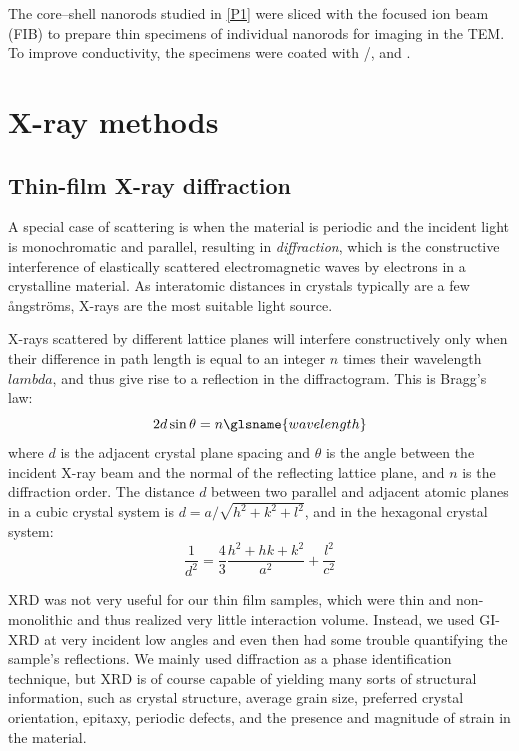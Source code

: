 \documentclass[draft,webedition,openright,titles,swedish,english]{LuaUUThesis}\usepackage[]{graphicx}\usepackage[]{xcolor}
\begin{document}
The core--shell nanorods studied in \cref{P1} were sliced with the
focused ion beam (FIB) to prepare thin specimens of individual nanorods for imaging in the \gls{TEM}.
To improve conductivity, the specimens were coated with /, and .




\section{X-ray methods}%
\label{methods:xray}

\subsection{Thin-film X-ray diffraction}%
\label{methods:XRD}

A special case of scattering is when the material is periodic and the
incident light is monochromatic and parallel, resulting in \emph{diffraction},
which is
the constructive interference of elastically scattered electromagnetic waves
by electrons in a crystalline material.
As interatomic distances in crystals typically are a few ångströms,
X-rays are the most suitable light source.

X-rays scattered by different lattice planes will interfere constructively only
when their difference in path length is equal to an integer $n$ times their
wavelength $lambda$, and thus give rise to a reflection in the diffractogram.
This is Bragg's law:
\begin{equation}\label{eq:xrd-bragg}
2d\sin\theta = n\glsname{wavelength}
\end{equation}
where $d$ is the adjacent crystal plane spacing and $\theta$ is the angle
between the incident X-ray beam and the normal of the reflecting lattice plane,
and $n$ is the diffraction order.
The distance $d$ between two parallel and adjacent atomic planes in
a cubic crystal system is $d = a/\sqrt{h^2+k^2+l^2}$, and in the
hexagonal crystal system:
\begin{equation}\label{eq:hexagonal-dhkl}
\frac{1}{d^2} = \frac{4}{3}\frac{h^2 + hk + k^2}{a^2} + \frac{l^2}{c^2}
\end{equation}

\Gls{XRD} was not very useful for our thin film samples, which were thin
and non-monolithic and thus realized very little interaction volume.
Instead, we used \gls{GI-XRD} at very incident low angles and even then had some
trouble quantifying the sample's reflections.
We mainly used diffraction as a phase identification technique, but \gls{XRD}
is of course capable of yielding many sorts of structural information,
such as crystal structure, average grain size, preferred crystal orientation,
epitaxy, periodic defects,
and the presence and magnitude of strain in the material.
\end{document}
